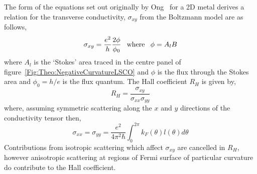 The form of the equations set out originally by Ong~\cite{Ong1991} for a 2D metal derives a relation for the transverse conductivity, $\sigma_{xy}$ from the Boltzmann model are as follows,
\begin{equation}
    \sigma_{xy} = \frac{e^2}{h}\frac{2\phi}{\phi_0} \hspace{8px}\textrm{where}\hspace{8px}\phi = A_l B
\end{equation}
where $A_l$ is the `Stokes' area traced in the centre panel of figure~\ref{Fig:Theo:NegativeCurvatureLSCO} and $\phi$ is the flux through the Stokes area and $\phi_0 = h/e$ is the flux quantum. The Hall coefficient $R_H$ is given by,
\begin{equation}
    R_H = \frac{\sigma_{xy}}{\sigma_{xx}\sigma_{yy}}
\end{equation}
where, assuming symmetric scattering along the $x$ and $y$ directions of the conductivity tensor then,
\begin{equation}
    \sigma_{xx} = \sigma_{yy} = \frac{e^2}{4\pi^2 \hbar} \int^{2\pi}_0 k_F(\theta) l(\theta) d\theta
\end{equation} 
Contributions from isotropic scattering which affect $\sigma_{xy}$ are cancelled in $R_H$, however anisotropic scattering at regions of Fermi surface of particular curvature do contribute to the Hall coefficient.
